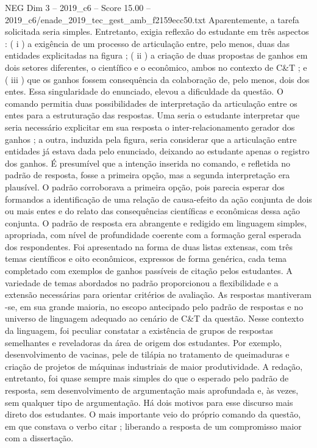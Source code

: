 \begin{textsample}{NEG Dim 3 – 2019\_c6 – Score 15.00 – 2019\_c6/enade\_2019\_tec\_gest\_amb\_f2159ecc50.txt}
Aparentemente, a tarefa solicitada seria simples.
Entretanto, exigia reflexão do estudante em três aspectos : ( i ) a exigência de um processo de articulação entre, pelo menos, duas das entidades explicitadas na figura ; ( ii ) a criação de duas propostas de ganhos em dois setores diferentes, o científico e o econômico, ambos no contexto de C\&T ; e ( iii ) que os ganhos fossem consequência da colaboração de, pelo menos, dois dos entes.
Essa singularidade do enunciado, elevou a dificuldade da questão.
O comando permitia duas possibilidades de interpretação da articulação entre os entes para a estruturação das respostas.
Uma seria o estudante interpretar que seria necessário explicitar em sua resposta o inter-relacionamento gerador dos ganhos ; a outra, induzida pela figura, seria considerar que a articulação entre entidades já estava dada pelo enunciado, deixando ao estudante apenas o registro dos ganhos.
É presumível que a intenção inserida no comando, e refletida no padrão de resposta, fosse a primeira opção, mas a segunda interpretação era plausível.
O padrão corroborava a primeira opção, pois parecia esperar dos formandos a identificação de uma relação de causa-efeito da ação conjunta de dois ou mais entes e do relato das consequências científicas e econômicas dessa ação conjunta.
O padrão de resposta era abrangente e redigido em linguagem simples, apropriada, com nível de profundidade coerente com a formação geral esperada dos respondentes.
Foi apresentado na forma de duas listas extensas, com três temas científicos e oito econômicos, expressos de forma genérica, cada tema completado com exemplos de ganhos passíveis de citação pelos estudantes.
A variedade de temas abordados no padrão proporcionou a flexibilidade e a extensão necessárias para orientar critérios de avaliação.
As respostas mantiveram -se, em sua grande maioria, no escopo antecipado pelo padrão de respostas e no universo de linguagem adequado ao cenário de C\&T da questão.
Nesse contexto da linguagem, foi peculiar constatar a existência de grupos de respostas semelhantes e reveladoras da área de origem dos estudantes.
Por exemplo, desenvolvimento de vacinas, pele de tilápia no tratamento de queimaduras e criação de projetos de máquinas industriais de maior produtividade.
A redação, entretanto, foi quase sempre mais simples do que o esperado pelo padrão de resposta, sem desenvolvimento de argumentação mais aprofundada e, às vezes, sem qualquer tipo de argumentação.
Há dois motivos para esse discurso mais direto dos estudantes.
O mais importante veio do próprio comando da questão, em que constava o verbo citar ; liberando a resposta de um compromisso maior com a dissertação.

\end{textsample}
